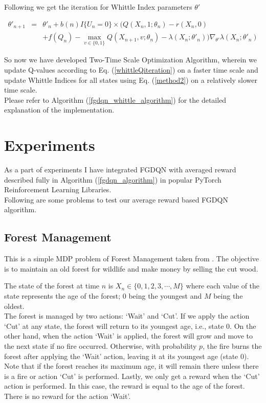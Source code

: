 \documentclass{article}
\theoremstyle{definition}
\begin{document}
Following we get the iteration for Whittle Index parameters $\theta'$

\begin{eqnarray}
\theta'_{n+1} &=& \theta'_n+b(n)I\{U_n=0\}\times\Big(Q(X_n,1;\theta_n)-r(X_n,0)
\nonumber \\&&+f(Q_n)-\max_{v\in\{0,1\}} Q(X_{n+1}, v; \theta_n)-\lambda(X_n;\theta'_n)\Big)\nabla_{\theta'}\lambda(X_n;\theta'_n)
\label{method2}\end{eqnarray}

So now we have developed Two-Time Scale Optimization Algorithm, wherein we update Q-values according to Eq. (\ref{whittleQiteration}) on a faster time scale and update Whittle Indices for all states using Eq. (\ref{method2}) on a relatively slower time scale.\\
Please refer to Algorithm (\ref{fgdqn_whittle_algorithm}) for the detailed explanation of the implementation.
\clearpage
\section{Experiments}
As a part of experiments I have integrated FGDQN with averaged reward described fully in Algorithm (\ref{fgdqn_algorithm}) in popular PyTorch Reinforcement Learning Libraries.\\
Following are some problems to test our average reward based FGDQN algorithm.
\subsection{Forest Management}
This is a simple MDP problem of Forest Management taken from \cite{avrachenkov2021gradient}. The objective is to maintain an old forest for wildlife and make money by selling the cut wood. 

The state of the forest at time $n$ is $ X_n \in \{0,1,2,3, \cdots, M\}$ where each value of the state represents the age of the forest; $0$ being the youngest and $M$ being the oldest.\\
The forest is managed by two actions: `Wait' and `Cut'. If we apply the action `Cut' at any state, the forest will return to its youngest age, i.e., state $0$. On the other hand, when the action `Wait' is applied, the forest will grow and move to the next state if no fire occurred. Otherwise, with probability $p$, the fire burns the forest after applying the `Wait' action, leaving it at its youngest age (state $0$). \\
Note that if the forest reaches its maximum age, it will remain there unless there is a fire or action `Cut' is performed. Lastly, we only get a reward when the `Cut' action is performed. In this case, the reward is equal to the age of the forest. There is no reward for the action `Wait'.
\end{document}
